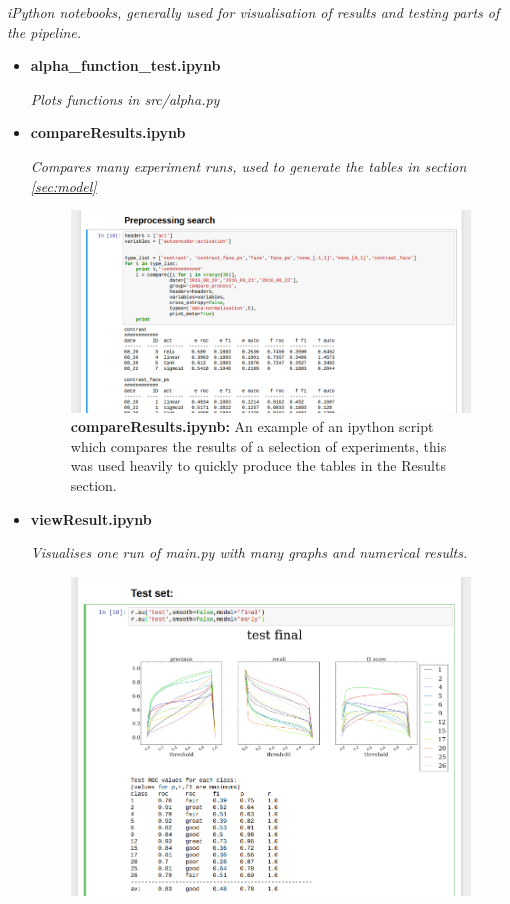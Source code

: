 {\begin{itemize}
                \begin{sloppypar} \textit{iPython notebooks, generally used for visualisation of results and testing parts of the pipeline.}\end{sloppypar}
                \begin{itemize}
                  \item {\bf alpha\_function\_test.ipynb }
                  \begin{sloppypar} \textit{Plots functions in src/alpha.py}\end{sloppypar}
                  \item {\bf compareResults.ipynb }
                  \begin{sloppypar} \textit{Compares many experiment runs, used to generate the tables in section \ref{sec:model}}\end{sloppypar}
                    \begin{figure}[!h]
                    \centering
                    \includegraphics[width =0.8\hsize]{figures/notebook2.png}
                    \caption{{\bf compareResults.ipynb: }An example of an ipython script which compares the results of a selection of experiments,
                    this was used heavily to quickly produce the tables in the Results section.}
                    \label{fig:compareresults}
                    \end{figure}
                  \item {\bf viewResult.ipynb }
                  \begin{sloppypar} \textit{Visualises one run of main.py with many graphs and numerical results.}\end{sloppypar}
                    \begin{figure}[!h]
                    \centering
                    \includegraphics[width =0.8\hsize]{figures/notebook1.png}

\end{figure}
\end{itemize}
\end{itemize}}
